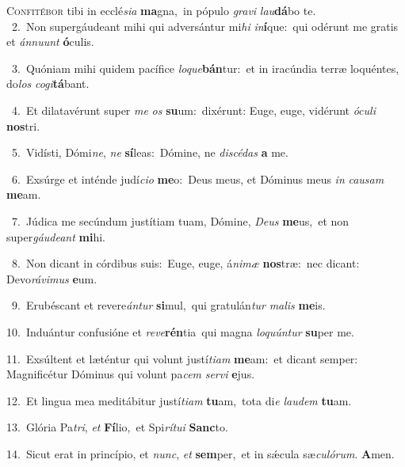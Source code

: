 \lettrine{\initial\textcolor{\initialcolor}{C}}{onfitébor} tibi in ecclé\-\textit{si}\-\textit{a} \textbf{ma}\-gna,~\star in pópulo \textit{gra}\-\textit{vi} \textit{lau}\-\textbf{dá}bo te.\\
{\numbfont\textcolor{\numbcolor}{~2.}}~Non supergáudeant mihi qui adversántur mi\textit{hi} \textit{in}\-\textbf{í}que:~\star qui odérunt me gratis et \textit{án}\-\textit{nu}\textit{unt} \textbf{ó}\-culis.\par
{\numbfont\textcolor{\numbcolor}{~3.}}~Quóniam mihi quidem pacífice \textit{lo}\-\textit{que}\textbf{bán}tur:~\star et in iracúndia terræ loquéntes, do\textit{los} \textit{co}\-\textit{gi}\textbf{tá}bant.\par
{\numbfont\textcolor{\numbcolor}{~4.}}~Et dilatavérunt super \textit{me} \textit{os} \textbf{su}\-um:~\star dixérunt: Euge, euge, vidérunt \textit{ó}\-\textit{cu}\textit{li} \textbf{nos}\-tri.\par
{\numbfont\textcolor{\numbcolor}{~5.}}~Vidísti, Dómi\-\textit{ne}\-, \textit{ne} \textbf{sí}\-leas:~\star Dómine, ne \textit{di}\-\textit{scé}\textit{das} \textbf{a} me.\par
{\numbfont\textcolor{\numbcolor}{~6.}}~Exsúrge et inténde judí\-\textit{ci}\-\textit{o} \textbf{me}\-o:~\star Deus meus, et Dóminus meus \textit{in} \textit{cau}\-\textit{sam} \textbf{me}\-am.\par
{\numbfont\textcolor{\numbcolor}{~7.}}~Júdica me secúndum justítiam tuam, Dómine, \textit{De}\-\textit{us} \textbf{me}\-us,~\star et non super\-\textit{gáu}\-\textit{de}\textit{ant} \textbf{mi}\-hi.\par
{\numbfont\textcolor{\numbcolor}{~8.}}~Non dicant in córdibus suis:~\dagger Euge, euge, á\-\textit{ni}\-\textit{mæ} \textbf{nos}\-træ:~\star nec dicant: Devo\-\textit{rá}\-\textit{vi}\textit{mus} \textbf{e}\-um.\par
{\numbfont\textcolor{\numbcolor}{~9.}}~Erubéscant et revere\-\textit{án}\-\textit{tur} \textbf{si}\-mul,~\star qui gratulán\textit{tur} \textit{ma}\-\textit{lis} \textbf{me}\-is.\par
{\numbfont\textcolor{\numbcolor}{10.}}~Induántur confusióne et \textit{re}\-\textit{ve}\textbf{rén}tia~\star qui magna \textit{lo}\-\textit{quún}\textit{tur} \textbf{su}\-per me.\par
{\numbfont\textcolor{\numbcolor}{11.}}~Exsúltent et læténtur qui volunt justí\-\textit{ti}\-\textit{am} \textbf{me}\-am:~\star et dicant semper: Magnificétur Dóminus qui volunt pa\textit{cem} \textit{ser}\-\textit{vi} \textbf{e}\-jus.\par
{\numbfont\textcolor{\numbcolor}{12.}}~Et lingua mea meditábitur justí\-\textit{ti}\-\textit{am} \textbf{tu}\-am,~\star tota di\textit{e} \textit{lau}\-\textit{dem} \textbf{tu}\-am.\par
{\numbfont\textcolor{\numbcolor}{13.}}~Glória Pa\-\textit{tri}\-, \textit{et} \textbf{Fí}\-lio,~\star et Spi\-\textit{rí}\-\textit{tu}\textit{i} \textbf{Sanc}\-to.\par
{\numbfont\textcolor{\numbcolor}{14.}}~Sicut erat in princípio, et \textit{nunc}\-, \textit{et} \textbf{sem}\-per,~\star et in sǽcula sæ\-\textit{cu}\-\textit{ló}\textit{rum}. \textbf{A}\-men.\par
